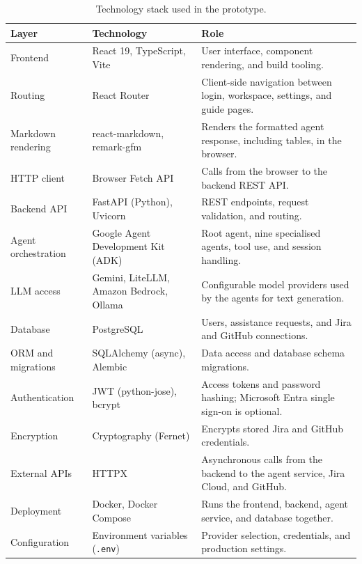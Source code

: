 \begin{table}[H]
\centering
\small
{}
\begin{tabularx}{\textwidth}{>{\raggedright\arraybackslash}p{}>{\raggedright\arraybackslash}p{}>{\raggedright\arraybackslash}X}
\toprule
\textbf{Layer} & \textbf{Technology} & \textbf{Role} \\
\midrule
Frontend & React 19, TypeScript, Vite & User interface, component rendering, and build tooling. \\
Routing & React Router & Client-side navigation between login, workspace, settings, and guide pages. \\
Markdown rendering & react-markdown, remark-gfm & Renders the formatted agent response, including tables, in the browser. \\
HTTP client & Browser Fetch API & Calls from the browser to the backend REST API. \\
Backend API & FastAPI (Python), Uvicorn & REST endpoints, request validation, and routing. \\
Agent orchestration & Google Agent Development Kit (ADK) & Root agent, nine specialised agents, tool use, and session handling. \\
LLM access & Gemini, LiteLLM, Amazon Bedrock, Ollama & Configurable model providers used by the agents for text generation. \\
Database & PostgreSQL & Users, assistance requests, and Jira and GitHub connections. \\
ORM and migrations & SQLAlchemy (async), Alembic & Data access and database schema migrations. \\
Authentication & JWT (python-jose), bcrypt & Access tokens and password hashing; Microsoft Entra single sign-on is optional. \\
Encryption & Cryptography (Fernet) & Encrypts stored Jira and GitHub credentials. \\
External APIs & HTTPX & Asynchronous calls from the backend to the agent service, Jira Cloud, and GitHub. \\
Deployment & Docker, Docker Compose & Runs the frontend, backend, agent service, and database together. \\
Configuration & Environment variables (\texttt{.env}) & Provider selection, credentials, and production settings. \\
\bottomrule
\end{tabularx}
\caption{Technology stack used in the prototype.}
\label{tab:technology-stack}
\end{table}

